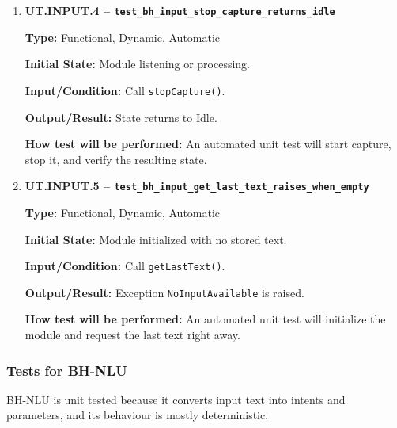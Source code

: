 \documentclass[12pt, titlepage]{article}
\begin{document}
\begin{enumerate}
\item \textbf{UT.INPUT.4 --
\texttt{test\_bh\_input\_stop\_capture\_returns\_idle}}

\textbf{Type:} Functional, Dynamic, Automatic

\textbf{Initial State:} Module listening or processing.

\textbf{Input/Condition:} Call \texttt{stopCapture()}.

\textbf{Output/Result:} State returns to Idle.

\textbf{How test will be performed:} An automated unit test will start capture,
stop it, and verify the resulting state.

\item \textbf{UT.INPUT.5 --
\texttt{test\_bh\_input\_get\_last\_text\_raises\_when\_empty}}

\textbf{Type:} Functional, Dynamic, Automatic

\textbf{Initial State:} Module initialized with no stored text.

\textbf{Input/Condition:} Call \texttt{getLastText()}.

\textbf{Output/Result:} Exception \texttt{NoInputAvailable} is raised.

\textbf{How test will be performed:} An automated unit test will initialize the
module and request the last text right away.

\end{enumerate}

\subsubsection{Tests for BH-NLU}

BH-NLU is unit tested because it converts input text into intents and
parameters, and its behaviour is mostly deterministic.
\end{document}
